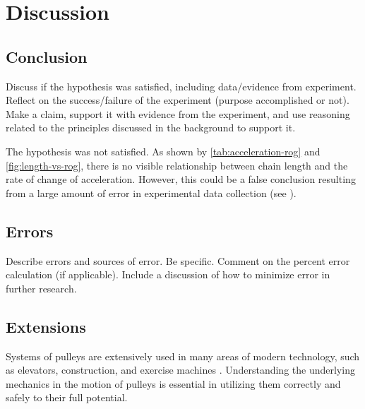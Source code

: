 \documentclass[stu,biblatex,floatsintext,draftall]{apa7}
\begin{document}
\section{Discussion}

\subsection{Conclusion}
Discuss if the hypothesis was satisfied, including data/evidence from experiment. Reflect on the success/failure of the experiment (purpose accomplished or not). Make a claim, support it with evidence from the experiment, and use reasoning related to the principles discussed in the background to support it.

The hypothesis was not satisfied. As shown by \autoref{tab:acceleration-rog} and \autoref{fig:length-vs-rog}, there is no visible relationship between chain length and the rate of change of acceleration. However, this could be a false conclusion resulting from a large amount of error in experimental data collection (see ).

\subsection{Errors}\label{sec:errors}
Describe errors and sources of error. Be specific. Comment on the percent error calculation (if applicable).  Include a discussion of how to minimize error in further research. 

\subsection{Extensions}
Systems of pulleys are extensively used in many areas of modern technology, such as elevators, construction, and exercise machines \parencite{Vork2018PulleyExamples}. Understanding the underlying mechanics in the motion of pulleys is essential in utilizing them correctly and safely to their full potential.

\printbibliography
\end{document}
